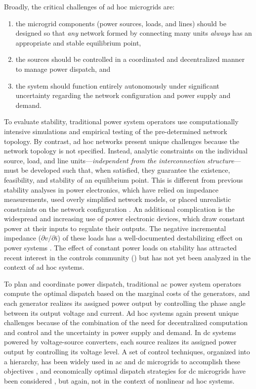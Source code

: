 \documentclass[letterpaper, 10 pt, conference]{ieeeconf}
\begin{document}
Broadly, the critical challenges of ad hoc microgrids are:

\begin{enumerate}
    \item the microgrid components (power sources, loads, and lines) should be designed so that \textit{any} network formed by connecting many units \textit{always} has an appropriate and stable equilibrium point,
    \item the sources should be controlled in a coordinated and decentralized manner to manage power dispatch, and
    \item the system should function entirely autonomously under significant uncertainty regarding the network configuration and power supply and demand.
\end{enumerate}

To evaluate stability, traditional power system operators use computationally intensive simulations and empirical testing of the pre-determined network topology. By contrast, ad hoc networks present unique challenges because the network topology is not specified. Instead, analytic constraints on the individual source, load, and line units---\textit{independent from the interconnection structure}---must be developed such that, when satisfied, they guarantee the existence, feasibility, and stability of an equilibrium point. This is different from previous stability analyses in power electronics, which have relied on impedance measurements, used overly simplified network models, or placed unrealistic constraints on the network configuration \cite{CriteriaReview,ROM}. An additional complication is the widespread and increasing use of power electronic devices, which draw constant power at their inputs to regulate their outputs. The negative incremental impedance ($\partial v/\partial i$) of these loads has a well-documented destabilizing effect on power systems \cite{cplinstability}. The effect of constant power loads on stability has attracted recent interest in the controls community (\cite{Sanchez:2013gl,Bolognani:2015ek,SimpsonPorco:2015hp,Cezar:2015io,Barabanov:2016ki}) but has not yet been analyzed in the context of ad hoc systems. 

To plan and coordinate power dispatch, traditional ac power system operators compute the optimal dispatch based on the marginal costs of the generators, and each generator realizes its assigned power output by controlling the phase angle between its output voltage and current. Ad hoc systems again present unique challenges because of the combination of the need for decentralized computation and control and the uncertainty in power supply and demand. In dc systems powered by voltage-source converters, each source realizes its assigned power output by controlling its voltage level. A set of control techniques, organized into a hierarchy, has been widely used in ac and dc microgrids to accomplish these objectives \cite{GuerreroHierarchy}, and economically optimal dispatch strategies for dc microgrids have been considered \cite{Zhao:2015eu}, but again, not in the context of nonlinear ad hoc systems.
\end{document}
